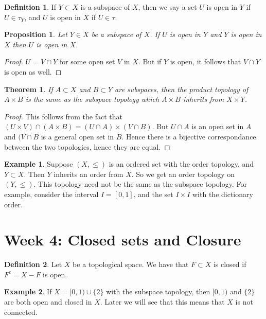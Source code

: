 \documentclass[12pt]{article}
\theoremstyle{plain}
\newtheorem{theorem}{Theorem}
\newtheorem{proposition}{Proposition}
\theoremstyle{definition}
\newtheorem{definition}{Definition}
\newtheorem{example}{Example}
\begin{document}
\begin{definition}
If $Y \subset X$ is a subspace of $X$, then we say a set $U$ is open in $Y$ if $U \in \tau_Y$, and $U$ is open in $X$ if $U \in \tau$.
\end{definition}

\begin{proposition}
Let $Y \in X$ be a subspace of $X$. If $U$ is open in $Y$ and $Y$ is open in $X$ then $U$ is open in $X$.
\end{proposition}
\begin{proof}
$U$ = $V \cap Y$ for some open set $V$ in $X$. But if $Y$ is open, it follows that $V \cap Y$ is open as well.
\end{proof}

\begin{theorem}
If $A \subset X$ and $B \subset Y$ are subspaces, then the product topology of $A \times B$ is the same as the subspace topology which $A \times B$ inherits from $X \times Y$.
\end{theorem}
\begin{proof}
This follows from the fact that $(U \times V) \cap (A \times B) = (U \cap A) \times (V \cap B)$. But $U \cap A$ is an open set in $A$ and $(V \cap B$ is a general open set in $B$. Hence there is a bijective correspondance between the two topologies, hence they are equal.
\end{proof}

\begin{example}
Suppose $(X, \leq)$ is an ordered set with the order topology, and $Y \subset X$. Then $Y$ inherits an order from $X$. So we get an order topology on $(Y, \leq)$. This topology need not be the same as the subspace topology. For example, consider the interval $I = [0,1]$, and the set $I \times I$ with the dictionary order. %
\end{example}

\section{Week 4: Closed sets and Closure}

\begin{definition}
Let $X$ be a topological space. We have that $F \subset X$ is closed if $F^c = X - F$ is open.
\end{definition}

\begin{example}
If $X = [0, 1) \cup \{2\}$ with the subspace topology, then $[0, 1)$ and $\{2\}$ are both open and closed in $X$. Later we will see that this means that $X$ is not connected.
\end{example}
\end{document}
